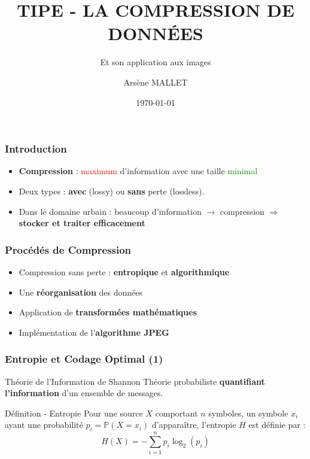 \documentclass{beamer}
\title[Compression]{TIPE - LA COMPRESSION DE DONN\'EES}
\subtitle{Et son application aux images}
\author{Ars\`ene MALLET}
\date[\today]{\today}
\institute{Candidat - 14873}
\begin{document}
\begin{frame}
    \titlepage
\end{frame}

\begin{frame}
    \frametitle{Introduction}

    \begin{itemize}
        \setlength\itemsep{2em}
        \item \Large \textbf{Compression} : \textcolor{red}{maximum} d'information avec une taille \textcolor{green}{minimal}
        \item Deux types : \textbf{avec} (lossy) ou \textbf{sans} perte (lossless).
        \item \large Dans le domaine urbain : beaucoup d'information $\rightarrow$ compression $\Rightarrow$ \bfseries stocker et traiter efficacement
    \end{itemize}

\end{frame}

\begin{frame}
    \frametitle{Proc\'ed\'es de Compression}

    \begin{itemize}
        \Large
        \setlength\itemsep{2em}
        \item Compression sans perte : \textbf{entropique} et \textbf{algorithmique}
        \item Une \textbf{réorganisation} des données
        \item Application de \textbf{transformées mathématiques}
        \item Implémentation de l'\textbf{algorithme JPEG}
    \end{itemize}

\end{frame}

\begin{frame}
    \frametitle[allowframebreaks]{Entropie et Codage Optimal (1)}

    \begin{block}{Th\'eorie de l'Information de Shannon}
        Théorie probabiliste \textbf{quantifiant l’information} d’un ensemble de messages.
    \end{block}
    
    \vspace*{1em}

    \begin{alertblock}{Définition - Entropie}
        Pour une source $X$ comportant $n$ symboles, un symbole $x_i$ ayant
        une probabilité $p_i = \mathbb{P}(X = x_i)$ d’apparaître, l'entropie $H$ est définie par : 
        $$ H(X) = - \sum_{i = 1}^{n} p_i \log_2 (p_i) $$
    \end{alertblock}
\end{frame}
\end{document}
